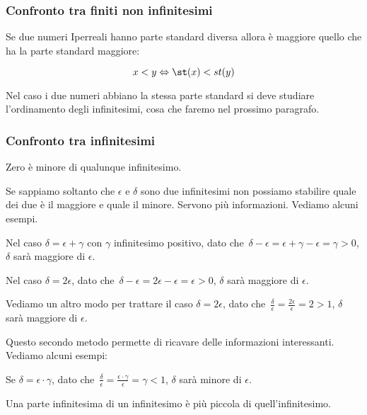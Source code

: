\subsubsection{Confronto tra finiti non infinitesimi}
\label{subsubsec:insnum_confrontoreali}

Se due numeri Iperreali hanno parte standard diversa allora è maggiore quello 
che ha la parte standard maggiore:

\[x < y \Leftrightarrow \st(x) < st(y)\]

Nel caso i due numeri abbiano la stessa parte standard si deve studiare 
l'ordinamento degli infinitesimi, cosa che faremo nel prossimo paragrafo.

\subsubsection{Confronto tra infinitesimi}
\label{subsubsec:insnum_confrontoreali}

Zero è minore di qualunque infinitesimo.

Se sappiamo soltanto che $\epsilon$ e $\delta$ sono due infinitesimi 
non possiamo stabilire quale dei due è il maggiore e quale il minore. 
Servono più informazioni. 
Vediamo alcuni esempi.

\begin{esempio}
Nel caso $\delta = \epsilon + \gamma$ con $\gamma$ infinitesimo positivo, 
dato che~$\delta-\epsilon=\epsilon+\gamma-\epsilon=\gamma>0$, 
$\delta$ sarà maggiore di $\epsilon$.
\end{esempio}

\begin{esempio}
Nel caso $\delta = 2\epsilon$, 
dato che~$\delta-\epsilon=2\epsilon-\epsilon=\epsilon>0$, 
$\delta$ sarà maggiore di $\epsilon$.
\end{esempio}

\begin{esempio}
Vediamo un altro modo per trattare il caso $\delta = 2\epsilon$, 
dato che~$\frac{\delta}{\epsilon}=\frac{2\epsilon}{\epsilon}=2>1$, 
$\delta$ sarà maggiore di $\epsilon$.
\end{esempio}

Questo secondo metodo permette di ricavare delle informazioni interessanti. 
Vediamo alcuni esempi:

\begin{esempio}
Se $\delta = \epsilon \cdot \gamma$, dato 
che~$\frac{\delta}{\epsilon}=\frac{\epsilon \cdot \gamma}{\epsilon}=\gamma<1$, 
$\delta$ sarà minore di $\epsilon$.

Una parte infinitesima di un infinitesimo è più piccola di quell'infinitesimo.
\end{esempio}

